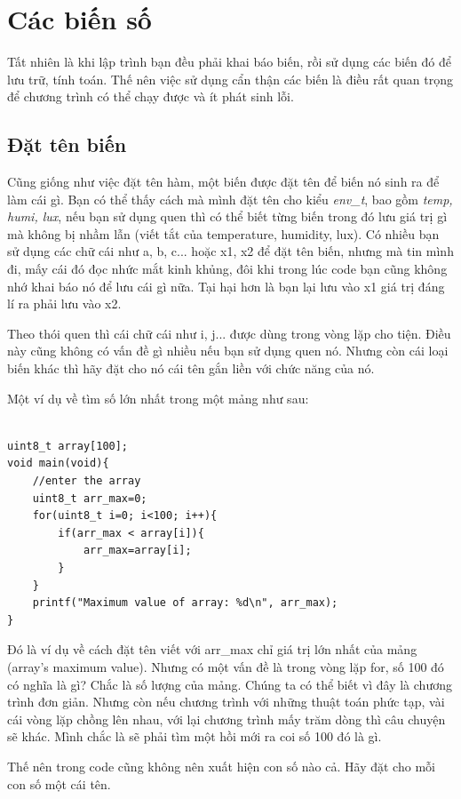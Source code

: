 \section{Các biến số}

Tất nhiên là khi lập trình bạn đều phải khai báo biến, rồi sử dụng các biến đó để lưu trữ, tính toán. Thế nên việc sử dụng cẩn thận các biến là điều rất quan trọng để chương trình có thể chạy được và ít phát sinh lỗi.
\subsection{Đặt tên biến}

Cũng giống như việc đặt tên hàm, một biến được đặt tên để biến nó sinh ra để làm cái gì. Bạn có thể thấy cách mà mình đặt tên cho kiểu \textit{env\_t}, bao gồm \textit{temp, humi, lux}, nếu bạn sử dụng quen thì có thể biết từng biến trong đó lưu giá trị gì mà không bị nhầm lẫn (viết tắt của temperature, humidity, lux). Có nhiều bạn sử dụng các chữ cái như a, b, c... hoặc x1, x2 để đặt tên biến, nhưng mà tin mình đi, mấy cái đó đọc nhức mắt kinh khủng, đôi khi trong lúc code bạn cũng không nhớ khai báo nó để lưu cái gì nữa. Tại hại hơn là bạn lại lưu vào x1 giá trị đáng lí ra phải lưu vào x2.

Theo thói quen thì cái chữ cái như i, j... được dùng trong vòng lặp cho tiện. Điều này cũng không có vấn đề gì nhiều nếu bạn sử dụng quen nó. Nhưng còn cái loại biến khác thì hãy đặt cho nó cái tên gắn liền với chức năng của nó.

Một ví dụ về tìm số lớn nhất trong một mảng như sau:
\begin{lstlisting}

uint8_t array[100];
void main(void){
	//enter the array
	uint8_t arr_max=0;
	for(uint8_t i=0; i<100; i++){
		if(arr_max < array[i]){
			arr_max=array[i];
		}
	}
	printf("Maximum value of array: %d\n", arr_max);
}

\end{lstlisting}


Đó là ví dụ về cách đặt tên viết với arr\_max chỉ giá trị lớn nhất của mảng (array's maximum value). Nhưng có một vấn đề là trong vòng lặp for, số 100 đó có nghĩa là gì? Chắc là số lượng của mảng. Chúng ta có thể biết vì đây là chương trình đơn giản. Nhưng còn nếu chương trình với những thuật toán phức tạp, vài cái vòng lặp chồng lên nhau, với lại chương trình mấy trăm dòng thì câu chuyện sẽ khác. Mình chắc là sẽ phải tìm một hồi mới ra coi số 100 đó là gì.

Thế nên trong code cũng không nên xuất hiện con số nào cả. Hãy đặt cho mỗi con số một cái tên.


